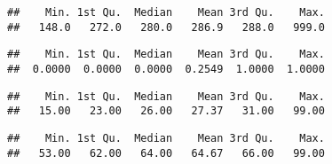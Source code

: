 \documentclass[
]{article}
\newenvironment{Shaded}{\begin{snugshade}}{\end{snugshade}}
\newcommand{\FunctionTok}[1]{\textcolor[rgb]{0.13,0.29,0.53}{\textbf{#1}}}
\newcommand{\NormalTok}[1]{#1}
\newcommand{\OtherTok}[1]{\textcolor[rgb]{0.56,0.35,0.01}{#1}}
\newcommand{\SpecialCharTok}[1]{\textcolor[rgb]{0.81,0.36,0.00}{\textbf{#1}}}
\begin{document}
\begin{verbatim}
##    Min. 1st Qu.  Median    Mean 3rd Qu.    Max. 
##   148.0   272.0   280.0   286.9   288.0   999.0
\end{verbatim}

\begin{Shaded}
\end{Shaded}

\begin{verbatim}
##    Min. 1st Qu.  Median    Mean 3rd Qu.    Max. 
##  0.0000  0.0000  0.0000  0.2549  1.0000  1.0000
\end{verbatim}

\begin{Shaded}
\end{Shaded}

\begin{verbatim}
##    Min. 1st Qu.  Median    Mean 3rd Qu.    Max. 
##   15.00   23.00   26.00   27.37   31.00   99.00
\end{verbatim}

\begin{Shaded}
\end{Shaded}

\begin{verbatim}
##    Min. 1st Qu.  Median    Mean 3rd Qu.    Max. 
##   53.00   62.00   64.00   64.67   66.00   99.00
\end{verbatim}

\begin{Shaded}
\end{Shaded}
\end{document}
